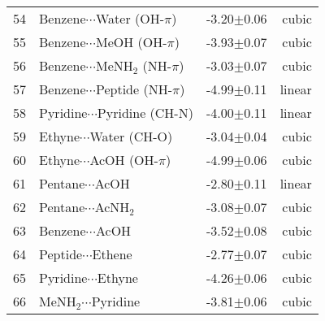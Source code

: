 \begin{longtable}{llrr}
54 & Benzene$\cdots$Water (OH-$\pi$) & -3.20$\pm$0.06 & cubic \\
55 & Benzene$\cdots$MeOH (OH-$\pi$) & -3.93$\pm$0.07 & cubic \\
56 & Benzene$\cdots$MeNH$_2$ (NH-$\pi$) & -3.03$\pm$0.07 & cubic \\
57 & Benzene$\cdots$Peptide (NH-$\pi$) & -4.99$\pm$0.11 & linear \\
58 & Pyridine$\cdots$Pyridine (CH-N) & -4.00$\pm$0.11 & linear \\
59 & Ethyne$\cdots$Water (CH-O) & -3.04$\pm$0.04 & cubic \\
60 & Ethyne$\cdots$AcOH (OH-$\pi$) & -4.99$\pm$0.06 & cubic \\
61 & Pentane$\cdots$AcOH & -2.80$\pm$0.11 & linear \\
62 & Pentane$\cdots$AcNH$_2$ & -3.08$\pm$0.07 & cubic \\
63 & Benzene$\cdots$AcOH & -3.52$\pm$0.08 & cubic \\
64 & Peptide$\cdots$Ethene & -2.77$\pm$0.07 & cubic \\
65 & Pyridine$\cdots$Ethyne & -4.26$\pm$0.06 & cubic \\
66 & MeNH$_2$$\cdots$Pyridine & -3.81$\pm$0.06 & cubic \\
\end{longtable}